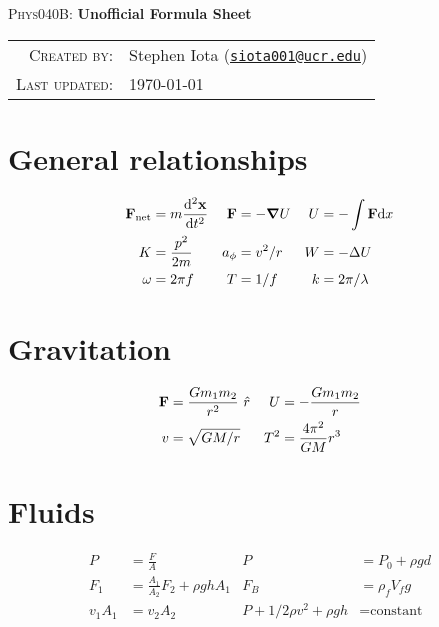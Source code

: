 \documentclass[10pt]{article}
\newcommand{\email}[1]{\texttt{\href{mailto:#1}{#1}}}
\begin{document}
\begin{center}

\Large{\textsc{Phys040B}: \textbf{Unofficial Formula Sheet}}
\end{center}
\vspace{.5mm}



\begin{tabular}{rl}
\textsc{Created by}:
&
Stephen Iota (\email{siota001@ucr.edu})
\\
\textsc{Last updated}:
&
\today
\end{tabular}


\section{General relationships}

\begin{align*}
\vb{F}_{\text{net}} &= m\dv[2]{\vb{x}}{t}
&
\vb{F} &= -\grad{U}
&
U &= -\int \vb{F} \text{d}x
\\
K &= \frac{p^2}{2m}
&
a_\phi &= v^2/r
&
W &= -\Delta U
\\
\omega &= 2\pi f
&
T &= 1/f
&
k &= 2\pi/\lambda
\end{align*}



\section{Gravitation}

\begin{align*}
\vb{F} &= \frac{Gm_1m_2}{r^2} \ \hat{r}
&
U &= -\frac{Gm_1m_2}{r}
\\
v &= \sqrt{GM/r}
&
T^2 &= \frac{4\pi^2}{GM}r^3
\\
\end{align*}




\section{Fluids}


\begin{align*}
P &= \frac{F}{A}
&
P &= P_0 + \rho gd
\\
F_1 &= \frac{A_1}{A_2} F_2 + \rho ghA_1
&
F_B &= \rho_f V_fg
\\
v_1A_1 &= v_2A_2
&
P + 1/2\rho v^2 + \rho gh &= \text{constant}
\end{align*}
\end{document}
